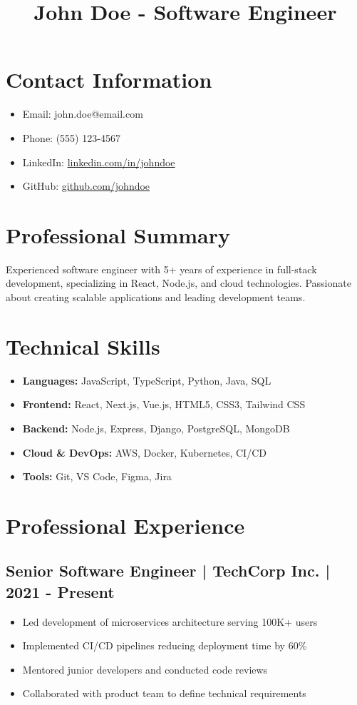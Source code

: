 \documentclass{article}
\title{John Doe - Software Engineer}
\author{}
\date{}
\begin{document}
\maketitle

\section*{Contact Information}
\begin{itemize}[leftmargin=0pt]
    \item Email: john.doe@email.com
    \item Phone: (555) 123-4567
    \item LinkedIn: \href{https://linkedin.com/in/johndoe}{linkedin.com/in/johndoe}
    \item GitHub: \href{https://github.com/johndoe}{github.com/johndoe}
\end{itemize}

\section*{Professional Summary}
Experienced software engineer with 5+ years of experience in full-stack development, specializing in React, Node.js, and cloud technologies. Passionate about creating scalable applications and leading development teams.

\section*{Technical Skills}
\begin{itemize}
    \item \textbf{Languages:} JavaScript, TypeScript, Python, Java, SQL
    \item \textbf{Frontend:} React, Next.js, Vue.js, HTML5, CSS3, Tailwind CSS
    \item \textbf{Backend:} Node.js, Express, Django, PostgreSQL, MongoDB
    \item \textbf{Cloud \& DevOps:} AWS, Docker, Kubernetes, CI/CD
    \item \textbf{Tools:} Git, VS Code, Figma, Jira
\end{itemize}

\section*{Professional Experience}

\subsection*{Senior Software Engineer | TechCorp Inc. | 2021 - Present}
\begin{itemize}
    \item Led development of microservices architecture serving 100K+ users
    \item Implemented CI/CD pipelines reducing deployment time by 60\%
    \item Mentored junior developers and conducted code reviews
    \item Collaborated with product team to define technical requirements
\end{itemize}
\end{document}
